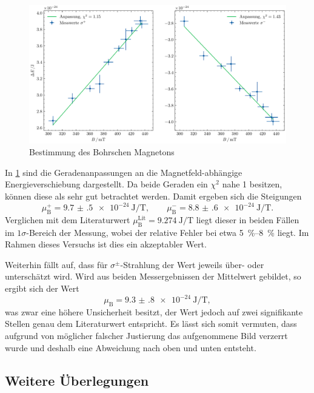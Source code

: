 \begin{figure}[htb]
    \centering
    \includegraphics[width=0.9\linewidth]{../figs/magneton}
    \caption{Bestimmung des Bohrschen Magnetons}
    \label{fig:bohr_magneton}
\end{figure}

In \cref{fig:bohr_magneton} sind die Geradenanpassungen an die Magnetfeld-abhängige 
Energieverschiebung dargestellt. Da beide Geraden ein $\chi^2$ nahe 1 
besitzen, können diese als sehr gut betrachtet werden. Damit ergeben sich die Steigungen 
\begin{equation}
    \mu_\mathrm B^+ = \SI{9.7(5)e-24}{\joule\per\tesla}, 
    \qquad \mu_\mathrm B^- = \SI{8.8(6)e-24}{\joule\per\tesla}
    \label{eq:magneton_exp}.
\end{equation}
Verglichen mit dem Literaturwert $\mu_\mathrm B^\mathrm{Lit} = \SI{9.274}{\joule\per\tesla}$
liegt dieser in beiden Fällen im $1\sigma$-Bereich der Messung, wobei der relative 
Fehler bei etwa \qtyrange{5}{8}{\percent} liegt. Im Rahmen dieses Versuchs 
ist dies ein akzeptabler Wert. 

Weiterhin fällt auf, dass für $\sigma^\pm$-Strahlung der Wert jeweils über- oder unterschätzt 
wird. Wird aus beiden Messergebnissen der Mittelwert gebildet, so ergibt sich der 
Wert 
\begin{equation*}
    \mu_\mathrm B = \SI{9.3(8)e-24}{\joule\per\tesla},
\end{equation*}
was zwar eine höhere Unsicherheit besitzt, der Wert jedoch auf zwei signifikante Stellen 
genau dem Literaturwert entspricht. Es lässt sich somit vermuten, dass aufgrund 
von möglicher falscher Justierung das aufgenommene Bild verzerrt wurde und deshalb 
eine Abweichung nach oben und unten entsteht.

\subsection{Weitere Überlegungen}
